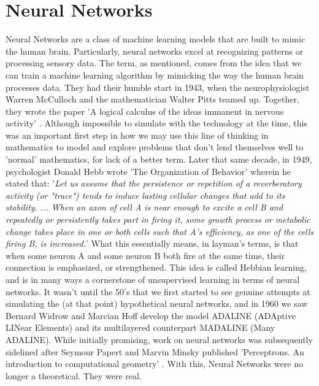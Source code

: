\documentclass[12pt]{article}
\begin{document}
{\section{Neural Networks}
Neural Networks are a class of machine learning models that are built to mimic the human brain. Particularly, neural networks excel at recognizing patterns or processing sensory data. The term, as mentioned, comes from the idea that we can train a machine learning algorithm by mimicking the way the human brain processes data. 
\newline They had their humble start in 1943, when the neurophysiologist Warren McCulloch and the mathematician Walter Pitts teamed up. Together, they wrote the paper 'A logical calculus of the ideas immanent in nervous activity' \cite{NN1943}. Although impossible to simulate with the technology at the time, this was an important first step in how we may use this line of thinking in mathematics to model and explore problems that don't lend themselves well to 'normal' mathematics, for lack of a better term. \newline
Later that same decade, in 1949, psychologist Donald Hebb wrote 'The Organization of Behavior'\cite{NN1949} wherein he stated that:
\newline
'\textit{\textcolor{direct-cite}{Let us assume that the persistence or repetition of a reverberatory activity (or "trace") tends to induce lasting cellular changes that add to its stability. ... When an axon of cell A is near enough to excite a cell B and repeatedly or persistently takes part in firing it, some growth process or metabolic change takes place in one or both cells such that A’s efficiency, as one of the cells firing B, is increased.}}'
\newline \label{hebbcite}
What this essentially means, in layman's terms, is that when some neuron A and some neuron B both fire at the same time, their connection is emphasized, or strengthened. This idea is called Hebbian learning, and is in many ways a cornerstone of unsupervised learning in terms of neural networks.
\newline
It wasn't until the 50's that we first started to see genuine attempts at simulating the (at that point) hypothetical neural networks, and in 1960 we saw Bernard Widrow and Marcian Hoff develop the model ADALINE (ADAptive LINear Elements) and its multilayered counterpart MADALINE (Many ADALINE). While initially promising, work on neural networks was subsequently sidelined after Seymour Papert and Marvin Minsky published 'Perceptrons. An introduction to computational geometry' \cite{NN1969}. With this, Neural Networks were no longer a theoretical. They were real.
}
\end{document}
